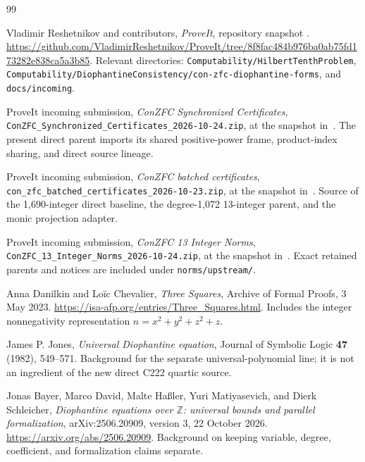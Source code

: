 \documentclass[11pt,letterpaper]{article}
\theoremstyle{definition}
\theoremstyle{remark}
\newcommand{\Z}{\mathbb Z}
\newcommand{\file}[1]{\nolinkurl{#1}}
\begin{document}
\begin{thebibliography}{99}
\raggedright

Vladimir Reshetnikov and contributors,
\emph{ProveIt}, repository snapshot
\texttt{\RepoPin}.
\url{https://github.com/VladimirReshetnikov/ProveIt/tree/8f8fac484b976ba0ab75fd173282e838ca5a3b85}.
Relevant directories: \file{Computability/HilbertTenthProblem},
\file{Computability/DiophantineConsistency/con-zfc-diophantine-forms},
and \file{docs/incoming}.

ProveIt incoming submission,
\emph{ConZFC Synchronized Certificates},
\file{ConZFC_Synchronized_Certificates_2026-10-24.zip}, at the snapshot
in~\cite{proveit}. The present direct parent imports its shared
positive-power frame, product-index sharing, and direct source lineage.

ProveIt incoming submission,
\emph{ConZFC batched certificates},
\file{con_zfc_batched_certificates_2026-10-23.zip}, at the snapshot
in~\cite{proveit}. Source of the 1,690-integer direct baseline,
the degree-1,072 13-integer parent, and the monic projection adapter.

ProveIt incoming submission,
\emph{ConZFC 13 Integer Norms},
\file{ConZFC_13_Integer_Norms_2026-10-24.zip}, at the snapshot
in~\cite{proveit}. Exact retained parents and notices are included
under \file{norms/upstream/}.

Anna Danilkin and Lo\"ic Chevalier,
\emph{Three Squares}, Archive of Formal Proofs, 3 May 2023.
\url{https://isa-afp.org/entries/Three_Squares.html}.
Includes the integer nonnegativity representation
$n=x^2+y^2+z^2+z$.

James P. Jones, \emph{Universal Diophantine equation},
Journal of Symbolic Logic \textbf{47} (1982), 549--571.
Background for the separate universal-polynomial line; it is not an
ingredient of the new direct C222 quartic source.

Jonas Bayer, Marco David, Malte Ha\ss ler, Yuri Matiyasevich, and
Dierk Schleicher,
\emph{Diophantine equations over $\Z$: universal bounds and parallel
formalization}, arXiv:2506.20909, version 3, 22 October 2026.
\url{https://arxiv.org/abs/2506.20909}.
Background on keeping variable, degree, coefficient, and formalization
claims separate.

\end{thebibliography}
\end{document}
